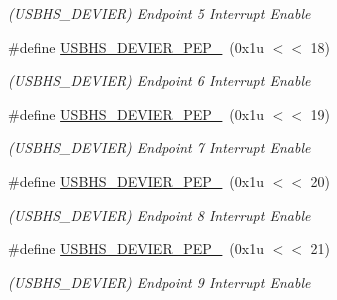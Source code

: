 \begin{DoxyCompactItemize}
\begin{DoxyCompactList}\small\item\em (U\+S\+B\+H\+S\+\_\+\+D\+E\+V\+I\+ER) Endpoint 5 Interrupt Enable \end{DoxyCompactList}\item 
\mbox{\label{group__SAME70__USBHS_gab1e6852eb17483b0a88793b4224e9bfa}} 
\#define \mbox{\hyperlink{group__SAME70__USBHS_gab1e6852eb17483b0a88793b4224e9bfa}{U\+S\+B\+H\+S\+\_\+\+D\+E\+V\+I\+E\+R\+\_\+\+P\+E\+P\+\_}}~(0x1u $<$$<$ 18)
\begin{DoxyCompactList}\small\item\em (U\+S\+B\+H\+S\+\_\+\+D\+E\+V\+I\+ER) Endpoint 6 Interrupt Enable \end{DoxyCompactList}\item 
\mbox{\label{group__SAME70__USBHS_ga69639d539ccbec8775cc4fd4a97c3c5f}} 
\#define \mbox{\hyperlink{group__SAME70__USBHS_ga69639d539ccbec8775cc4fd4a97c3c5f}{U\+S\+B\+H\+S\+\_\+\+D\+E\+V\+I\+E\+R\+\_\+\+P\+E\+P\+\_}}~(0x1u $<$$<$ 19)
\begin{DoxyCompactList}\small\item\em (U\+S\+B\+H\+S\+\_\+\+D\+E\+V\+I\+ER) Endpoint 7 Interrupt Enable \end{DoxyCompactList}\item 
\mbox{\label{group__SAME70__USBHS_ga31087c3b3d3c78d034e7a277f13e85da}} 
\#define \mbox{\hyperlink{group__SAME70__USBHS_ga31087c3b3d3c78d034e7a277f13e85da}{U\+S\+B\+H\+S\+\_\+\+D\+E\+V\+I\+E\+R\+\_\+\+P\+E\+P\+\_}}~(0x1u $<$$<$ 20)
\begin{DoxyCompactList}\small\item\em (U\+S\+B\+H\+S\+\_\+\+D\+E\+V\+I\+ER) Endpoint 8 Interrupt Enable \end{DoxyCompactList}\item 
\mbox{\label{group__SAME70__USBHS_ga35c6c650e417e85c0e102c2eb98c1d21}} 
\#define \mbox{\hyperlink{group__SAME70__USBHS_ga35c6c650e417e85c0e102c2eb98c1d21}{U\+S\+B\+H\+S\+\_\+\+D\+E\+V\+I\+E\+R\+\_\+\+P\+E\+P\+\_}}~(0x1u $<$$<$ 21)
\begin{DoxyCompactList}\small\item\em (U\+S\+B\+H\+S\+\_\+\+D\+E\+V\+I\+ER) Endpoint 9 Interrupt Enable \end{DoxyCompactList}\item 

\end{DoxyCompactItemize}
